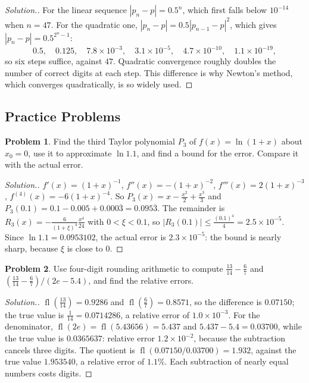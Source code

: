 \documentclass[11pt,a4paper]{article}
\numberwithin{equation}{section}
\DeclareMathOperator{\fl}{fl}
\theoremstyle{definition}
\newtheorem{problemx}{Problem}[subsection]
\newenvironment{problem}{\begin{problemx}}{\end{problemx}}
\newenvironment{solution}
  {\renewcommand{\qedsymbol}{}\begin{proof}[\textit{Solution}.]}
  {\end{proof}}
\begin{document}
\begin{solution}
For the linear sequence $|p_n-p| = 0.5^n$, which first falls below $10^{-14}$ when $n = 47$. For the quadratic one,
$|p_n-p| = 0.5|p_{n-1}-p|^2$, which gives $|p_n-p| = 0.5^{2^n-1}$:
$$0.5,\quad 0.125,\quad 7.8\times10^{-3},\quad 3.1\times10^{-5},\quad 4.7\times10^{-10},\quad 1.1\times10^{-19},$$
so six steps suffice, against $47$. Quadratic convergence roughly doubles the number of correct digits at each step. This difference is why
Newton's method, which converges quadratically, is so widely used.
\end{solution}


\subsection{Practice Problems}

\begin{problem}
Find the third Taylor polynomial $P_3$ of $f(x) = \ln(1+x)$ about $x_0 = 0$, use it to approximate $\ln 1.1$, and find a bound for the
error. Compare it with the actual error.
\end{problem}
\begin{solution}
$f'(x) = (1+x)^{-1}$, $f''(x) = -(1+x)^{-2}$, $f'''(x) = 2(1+x)^{-3}$, $f^{(4)}(x) = -6(1+x)^{-4}$. So $P_3(x) = x-\frac{x^2}{2}+\frac{x^3}{3}$
and $P_3(0.1) = 0.1-0.005+0.000\overline{3} = 0.095\overline{3}$. The remainder is $R_3(x) = -\frac{6}{(1+\xi)^4}\frac{x^4}{24}$ with
$0<\xi<0.1$, so $|R_3(0.1)|\leq\frac{(0.1)^4}{4} = 2.5\times10^{-5}$. Since $\ln1.1 = 0.0953102$, the actual error is $2.3\times10^{-5}$:
the bound is nearly sharp, because $\xi$ is close to $0$.
\end{solution}

\begin{problem}
Use four-digit rounding arithmetic to compute $\frac{13}{14}-\frac67$ and $\left(\frac{13}{14}-\frac67\right)/(2e-5.4)$, and find the
relative errors.
\end{problem}
\begin{solution}
$\fl\left(\frac{13}{14}\right) = 0.9286$ and $\fl\left(\frac67\right) = 0.8571$, so the difference is $0.07150$; the true value is
$\frac1{14} = 0.0714286$, a relative error of $1.0\times10^{-3}$. For the denominator, $\fl(2e) = \fl(5.43656) = 5.437$ and
$5.437-5.4 = 0.03700$, while the true value is $0.0365637$: relative error $1.2\times10^{-2}$, because the subtraction cancels three
digits. The quotient is $\fl(0.07150/0.03700) = 1.932$, against the true value $1.953540$, a relative error of $1.1\%$. Each subtraction
of nearly equal numbers costs digits.
\end{solution}
\end{document}
